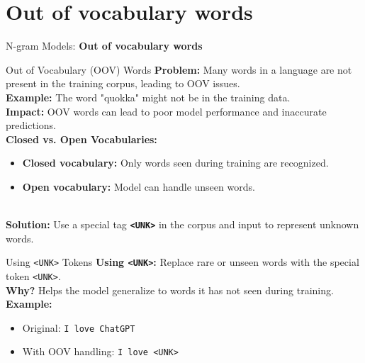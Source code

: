 \section{Out of vocabulary words}
\begin{frame}{}
    \LARGE N-gram Models: \textbf{Out of vocabulary words}
\end{frame}

\begin{frame}{Out of Vocabulary (OOV) Words}
    \textbf{Problem:} Many words in a language are not present in the training corpus, leading to OOV issues. \\
    \vspace{1em}
    \pause
    \textbf{Example:} The word "quokka" might not be in the training data. \\
    \vspace{1em}
    \pause
    \textbf{Impact:} OOV words can lead to poor model performance and inaccurate predictions. \\
    \vspace{1em}
    \pause
    \textbf{Closed vs. Open Vocabularies:}
    \begin{itemize}
        \item \textbf{Closed vocabulary:} Only words seen during training are recognized.
        \item \textbf{Open vocabulary:} Model can handle unseen words.
    \end{itemize} \\
    \vspace{0.5em}
    \pause
    \textbf{Solution:} Use a special tag \textbf{\texttt{<UNK>}} in the corpus and input to represent unknown words.
\end{frame}

\begin{frame}{Using \texttt{<UNK>} Tokens}
    \textbf{Using \texttt{<UNK>}:} Replace rare or unseen words with the special token \texttt{<UNK>}. \\
    \vspace{1em}
    \pause
    \textbf{Why?} Helps the model generalize to words it has not seen during training. \\
    \vspace{1em}
    \pause
    \textbf{Example:}
    \begin{itemize}
        \item Original: \texttt{I love ChatGPT}
        \item With OOV handling: \texttt{I love <UNK>}
    \end{itemize}
\end{frame}

